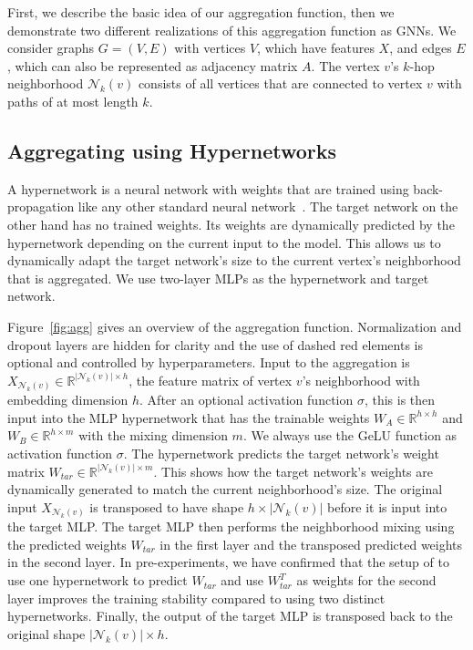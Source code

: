 \documentclass[conference]{IEEEtran}
\begin{document}
First, we describe the basic idea of our aggregation function, then we demonstrate two different realizations of this aggregation function as GNNs.
We consider graphs $G=(V, E)$ with vertices $V$, which have features $X$, and edges $E$, which can also be represented as adjacency matrix $A$.
The vertex $v$'s $k$-hop neighborhood $\mathcal{N}_k(v)$ consists of all vertices that are connected to vertex $v$ with paths of at most length $k$.

\subsection{Aggregating using Hypernetworks}
A hypernetwork is a neural network with weights that are trained using back-propagation like any other standard neural network~\cite{DBLP:conf/iclr/HaDL17}.
The target network on the other hand has no trained weights.
Its weights are dynamically predicted by the hypernetwork depending on the current input to the model.
This allows us to dynamically adapt the target network's size to the current vertex's neighborhood that is aggregated.
We use two-layer MLPs as the hypernetwork and target network.

Figure~\ref{fig:agg} gives an overview of the aggregation function.
Normalization and dropout layers are hidden for clarity and the use of dashed red elements is optional and controlled by hyperparameters. 
Input to the aggregation is $X_{\mathcal{N}_k(v)} \in \mathbb{R}^{|\mathcal{N}_k(v)|\times h}$, the feature matrix of vertex $v$'s neighborhood with embedding dimension $h$.
After an optional activation function $\sigma$, this is then input into the MLP hypernetwork that has the trainable weights $W_A \in  \mathbb{R}^{h\times h}$ and $W_B \in  \mathbb{R}^{h\times m}$ with the mixing dimension $m$.
We always use the GeLU function as activation function $\sigma$. 
The hypernetwork predicts the target network's weight matrix $W_{tar} \in \mathbb{R}^{|\mathcal{N}_k(v)|\times m}$.
This shows how the target network's weights are dynamically generated to match the current neighborhood's size.
The original input $X_{\mathcal{N}_k(v)}$ is transposed to have shape ${h \times |\mathcal{N}_k(v)|}$ before it is input into the target MLP.
The target MLP then performs the neighborhood mixing using the predicted weights $W_{tar}$ in the first layer and the transposed predicted weights in the second layer.
In pre-experiments, we have confirmed that the setup of \citet{DBLP:conf/acl/MaiPFCMF023} to use one hypernetwork to predict $W_{tar}$ and use $W^T_{tar}$ as weights for the second layer improves the training stability compared to using two distinct hypernetworks.
Finally, the output of the target MLP is transposed back to the original shape  $|\mathcal{N}_k(v)|\times h$.
\end{document}
